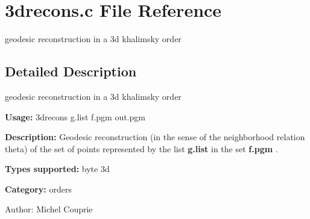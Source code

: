 \section{3drecons.c File Reference}
\label{3drecons_8c}
geodesic reconstruction in a 3d khalimsky order  




\label{_details}
\subsection{Detailed Description}
geodesic reconstruction in a 3d khalimsky order 

{\bf Usage:} 3drecons g.list f.pgm out.pgm

{\bf Description:} Geodesic reconstruction (in the sense of the neighborhood relation theta) of the set of points represented by the list {\bf g.list} in the set {\bf f.pgm} .

{\bf Types supported:} byte 3d

{\bf Category:} orders

\begin{Desc}
\item[Author:]Michel Couprie \end{Desc}
